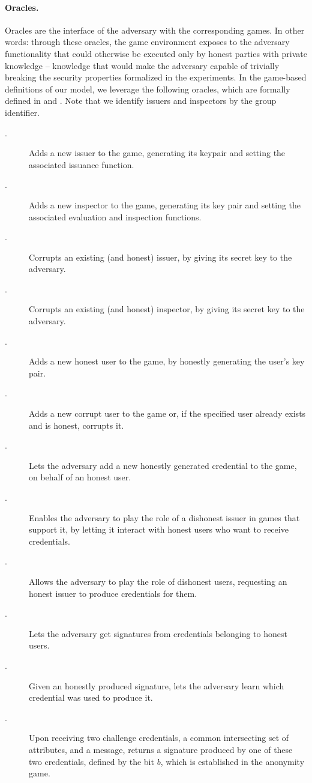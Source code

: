 \paragraph{Oracles.} %
Oracles are the interface of the adversary with the corresponding games. In
other words: through these oracles, the game environment exposes to the adversary
functionality that could otherwise be executed only by honest parties with
private knowledge -- knowledge that would make the adversary capable of
trivially breaking the security properties formalized in the experiments.
In the game-based definitions of our \GSAC model, we leverage the following
oracles, which are formally defined in  and
. Note that we identify issuers and inspectors by the group
identifier.

\begin{description}
\item[\IGEN.] Adds a new issuer to the game, generating its keypair and setting
  the associated issuance function.
\item[\OGEN.] Adds a new inspector to the game, generating its key pair and
  setting the associated evaluation and inspection functions.
\item[\ICORR.] Corrupts an existing (and honest) issuer, by giving its secret
  key to the adversary.
\item[\OCORR.] Corrupts an existing (and honest) inspector, by giving its secret
  key to the adversary.  
\item[\HUGEN.] Adds a new honest user to the game, by honestly generating
  the user's key pair.
\item[\CUGEN.] Adds a new corrupt user to the game or, if the specified
  user already exists and is honest, corrupts it.
\item[\OBTISS.] Lets the adversary add a new honestly generated credential to
  the game, on behalf of an honest user.
\item[\OBTAIN.] Enables the adversary to play the role of a dishonest issuer
  in games that support it, by letting it interact with honest users who want to
  receive credentials.
\item[\ISSUE.] Allows the adversary to play the role of dishonest users,
  requesting an honest issuer to produce credentials for them.
\item[\SIGN.] Lets the adversary get signatures from credentials belonging
  to honest users.
\item[\OPEN.] Given an honestly produced signature, lets the adversary learn
  which credential was used to produce it.
\item[\CHALb.] Upon receiving two challenge credentials, a common intersecting
  set of attributes, and a message, returns a signature produced by one of these
  two credentials, defined by the bit $b$, which is established in the anonymity
  game.
\end{description}

